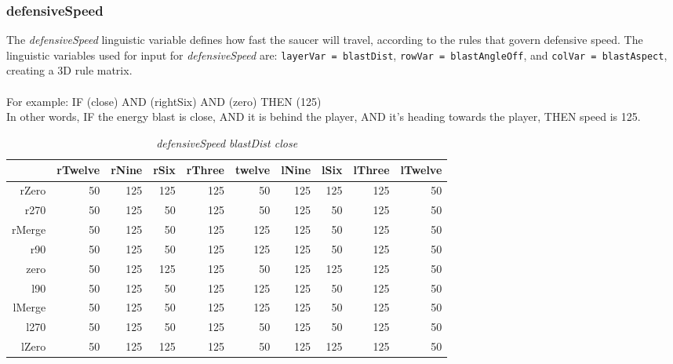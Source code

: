 \subsubsection{defensiveSpeed}

The \emph{defensiveSpeed} linguistic variable defines how fast the saucer will travel, according to the rules that govern defensive speed. The linguistic variables used for input for \emph{defensiveSpeed} are: \texttt{layerVar = blastDist}, \texttt{rowVar = blastAngleOff}, and \texttt{colVar = blastAspect}, creating a 3D rule matrix.
\\
\\
For example: IF (close) AND (rightSix) AND (zero) THEN (125) \\
In other words, IF the energy blast is close, AND it is behind the player, AND it's heading towards the player, THEN speed is 125.

\begin{table}[H]
\centering
\caption{\emph{defensiveSpeed} \emph{blastDist close}}
\label{Turn rule table}
\begin{tabular}{r|r|r|r|r|r|r|r|r|r}
 		& rTwelve 	& rNine 	& rSix 		& rThree 		& twelve 	& lNine 	& lSix 		& lThree	& lTwelve		\\ \hline
rZero	& 50		& 125		& 125		& 125 		 	& 50		& 125		& 125 		& 125		& 50			\\
r270	& 50		& 125		& 50		& 125			& 50		& 125		& 50		& 125		& 50			\\
rMerge	& 50		& 125		& 50	 	& 125			& 125		& 125		& 50		& 125		& 50			\\
r90		& 50		& 125		& 50 		& 125			& 125		& 125		& 50		& 125		& 50			\\
zero 	& 50		& 125 		& 125 		& 125			& 50		& 125		& 125		& 125		& 50			\\
l90 	& 50		& 125 		& 50		& 125			& 125		& 125		& 50		& 125		& 50			\\
lMerge	& 50		& 125 		& 50	 	& 125			& 125		& 125		& 50		& 125		& 50			\\
l270 	& 50		& 125	 	& 50 		& 125			& 50		& 125		& 50		& 125		& 50			\\
lZero 	& 50		& 125 		& 125	 	& 125			& 50		& 125  		& 125		& 125		& 50			
\end{tabular}
\end{table}

